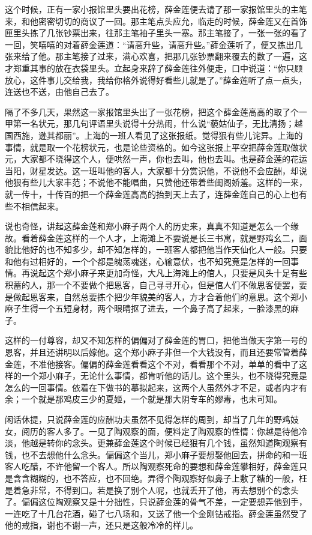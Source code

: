 \documentclass[12pt,UTF8]{ctexbook}
\begin{document}
{{{这个时候，正有一家小报馆里头要出花榜，薛金莲便去请了那一家报馆里头的主笔来，和他密密切切的商议了一回。那主笔点头应允，临走的时候，薛金莲又在首饰匣里头拣了几张钞票出来，往那主笔袖子里头一塞。那主笔接了，一张一张的看了一回，笑嘻嘻的对着薛金莲道：“请高升些，请高升些。”薛金莲听了，便又拣出几张来给了他。那主笔接了过来，满心欢喜，把那几张钞票翻来覆去的数了一遍，这才郑重其事的放在衣袋里头。立起身来辞了薛金莲往外便走，口中说道：“你只顾放心，这件事儿交给我，我给你格外说得好看些儿就是了。”薛金莲听了点一点头，连送也不送，由他自己去了。

隔了不多几天，果然这一家报馆里头出了一张花榜，把这个薛金莲高高的取了个一甲第一名状元，那几句评语里头说得十分热闹，什么说“藐姑仙子，无比清扬；越国西施，逊其都丽”。上海的一班人看见了这张报纸。觉得狠有些儿诧异。上海的事情，就是取一个花榜状元，也是论些资格的。如今这张报上平空把薛金莲取做状元，大家都不晓得这个人，便哄然一声，你也去叫，他也去叫。也是薛金莲的花运当阳，财星发达。这一班叫他的客人，大家都十分赏识他，不说他不会应酬，却说他狠有些儿大家丰范；不说他不能唱曲，只赞他还带着些闺阁娇羞。这样的一来，就一传十，十传百的把一个薛金莲高高的抬到天上去了，连薛金莲自己的心上也有些不相信起来。

说也奇怪，讲起这薛金莲和郑小麻子两个人的历史来，真真不知道是怎么一个缘故。看着薛金莲这样的一个人才，上海滩上不要说是长三书寓，就是野鸡幺二，面貌比他好的也不知多少，却不知怎样的，一班客人都把他当作天仙化人一般。只要和他有过相好的，一个个都是魄荡魂迷，心输意伏，也不知究竟是怎样的一回事情。再说起这个郑小麻子来更加奇怪，大凡上海滩上的倌人，只要是风头十足有些积蓄的人，那一个不要做个把恩客，自己寻寻开心，但是倌人们不做思客便罢，要是做起恩客来，自然总要拣个把少年貌美的客人，方才合着他们的意思。这个郑小麻子生得一个五短身材，两个眼睛抠了进去，一个鼻子高了起来，一脸漆黑的麻子。

这样的一付尊容，却又不知怎样的偏偏对了薛金莲的胃口，把他当做天字第一号的恩客，并且还讲明以后嫁他。这个郑小麻子非但一个大钱没有，而且还要常管着薛金莲，不准他接客。偏偏的薛金莲看看这个不对，看看那个不对，单单的看中了这样的一个郑小麻子，无论什么事情，都肯听他的话儿。这个里头，也不晓得究竟是怎么的一回事情。依着在下做书的摹拟起来，这两个人虽然外才不足，或者内才有余；一个就是那鸡皮三少的夏姬，一个就是那大阴专车的嫪毒，也未可知。

闲话休提，只说薛金莲的应酬功夫虽然不见得怎样的周到，却当了几年的野鸡妓女，阅历的客人多了。一见了陶观察的面，便料定了陶观察的性情：你越是待他冷淡，他越是转你的念头。更兼薛金莲这个时候已经狠有几个钱，虽然知道陶观察有钱，也不去想他什么念头。偏偏这个当儿，郑小麻子要想娶他回去，拼命的和一班客人吃醋，不许他留一个客人。所以陶观察死命的要想和薛金莲攀相好，薛金莲只是含含糊糊的，也不答应，也不回绝。弄得个陶观察好似鼻子上敷了糖的一般，枉是着急非常，不得到口。若是换了别个人呢，也就丢开了他，再去想别个的念头了。偏偏这位陶观察又是十分拙性，只说薛金莲的骨气不差，一定要想弄他到手，一连吃了十几台花酒，碰了七八场和，又送了他一个金刚钻戒指。薛金莲虽然受了他的戒指，谢也不谢一声，还只是这般冷冷的样儿。

}}}
\end{document}
